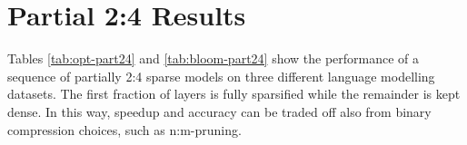 \documentclass{article}
\theoremstyle{plain}
\theoremstyle{definition}
\theoremstyle{remark}
\begin{document}
\section{Partial 2:4 Results}
\label{app:partial-24}

Tables \ref{tab:opt-part24} and \ref{tab:bloom-part24} show the performance of a sequence of partially 2:4 sparse models on three different language modelling datasets. The first fraction of layers is fully sparsified while the remainder is kept dense. In this way, speedup and accuracy can be traded off also from binary compression choices, such as n:m-pruning.
\vspace{-5pt}
\begin{table}[h!]
    \centering
    \caption{Pruning different fractions (as consecutive segments from the beginning) of OPT-175B layers to the 2:4 pattern.}
    \vspace{5pt}
    \label{tab:opt-part24}
\end{table}
\vspace{-15pt}
\begin{table}[h!]
    \centering
    \caption{Pruning different fractions (as consecutive segments from the beginning) of BLOOM-176B layers to the 2:4 pattern.}
    \vspace{5pt}
    \label{tab:bloom-part24}
\end{table}
\end{document}
